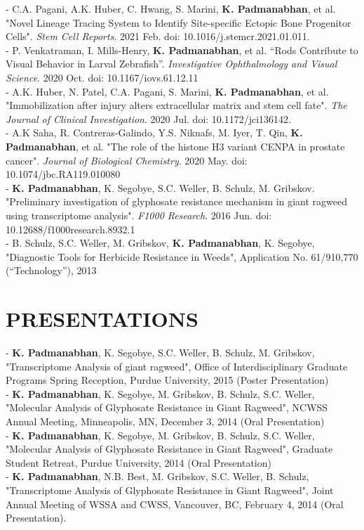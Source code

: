 \documentclass[11pt,letterpaper,sans]{moderncv}        %
\begin{document}
{\begin{minipage}{\maincolumnwidth}
{	- C.A. Pagani, A.K. Huber, C. Hwang, S. Marini, \textbf{K. Padmanabhan}, et al. "Novel Lineage Tracing System to Identify Site-specific Ectopic Bone Progenitor Cells". \textit{Stem Cell Reports}. 2021 Feb. doi: 10.1016/j.stemcr.2021.01.011.\\
          - P. Venkatraman, I. Mills-Henry, \textbf{K. Padmanabhan}, et al. “Rods Contribute to Visual Behavior in Larval Zebrafish”. \textit{Investigative Ophthalmology and Visual Science}. 2020 Oct. doi: 10.1167/iovs.61.12.11\\
	- A.K. Huber, N. Patel, C.A. Pagani, S. Marini, \textbf{K. Padmanabhan}, et al. "Immobilization after injury alters extracellular matrix and stem cell fate". \textit{The Journal of Clinical Investigation}. 2020 Jul. doi: 10.1172/jci136142.\\
          - A.K Saha, R. Contreras-Galindo, Y.S. Niknafs, M. Iyer, T. Qin, \textbf{K. Padmanabhan}, et al. "The role of the histone H3 variant CENPA in prostate cancer". \textit{Journal of Biological Chemistry}. 2020 May. doi: 10.1074/jbc.RA119.010080\\
	- \textbf{K. Padmanabhan}, K. Segobye, S.C. Weller, B. Schulz, M. Gribskov. "Preliminary investigation of glyphosate resistance mechanism in giant ragweed using transcriptome analysis". \textit{F1000 Research}. 2016 Jun. doi: 10.12688/f1000research.8932.1\\
	- B. Schulz, S.C. Weller, M. Gribskov, \textbf{K. Padmanabhan}, K. Segobye, "Diagnostic Tools for Herbicide Resistance in Weeds", Application No. 61/910,770 (“Technology”), 2013
	}%
\end{minipage}%



\section{PRESENTATIONS}
\begin{minipage}{\maincolumnwidth}%
	\small{
	- \textbf{K. Padmanabhan}, K. Segobye, S.C. Weller, B. Schulz, M. Gribskov, "Transcriptome Analysis of giant ragweed", Office of Interdisciplinary Graduate Programs Spring Reception, Purdue University, 2015 (Poster Presentation)\\
	- \textbf{K. Padmanabhan}, K. Segobye, M. Gribskov, B. Schulz, S.C. Weller, "Molecular Analysis of Glyphosate Resistance in Giant Ragweed", NCWSS Annual Meeting, Minneapolis, MN, December 3, 2014 (Oral Presentation)\\
	- \textbf{K. Padmanabhan}, K. Segobye, M. Gribskov, B. Schulz, S.C. Weller, "Molecular Analysis of Glyphosate Resistance in Giant Ragweed", Graduate Student Retreat, Purdue University, 2014 (Oral Presentation)\\
          - \textbf{K. Padmanabhan}, N.B. Best, M. Gribskov, S.C. Weller, B. Schulz, "Transcriptome Analysis of Glyphosate Resistance in Giant Ragweed", Joint Annual Meeting of WSSA and CWSS, Vancouver, BC, February 4, 2014 (Oral Presentation).  
	}%
\end{minipage}%

}
\end{document}
